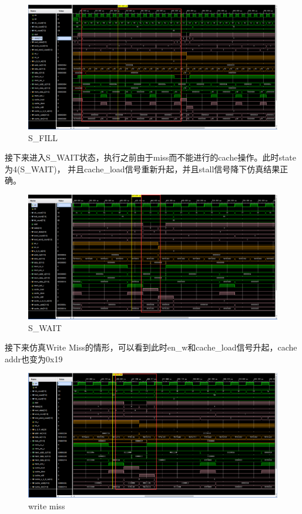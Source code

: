 \begin{figure}[H]
    \centering
    \includegraphics[width=1.0\textwidth]{figs/sres3.png}
    \caption{S\_FILL}
    \label{Fig.6}
\end{figure}

接下来进入S\_WAIT状态，执行之前由于miss而不能进行的cache操作。此时state为4(S\_WAIT)，
并且cache\_load信号重新升起，并且stall信号降下仿真结果正确。

\begin{figure}[H]
    \centering
    \includegraphics[width=1.0\textwidth]{figs/sres4.png}
    \caption{S\_WAIT}
    \label{Fig.7}
\end{figure}

接下来仿真Write Miss的情形，可以看到此时en\_w和cache\_load信号升起，cache addr也变为0x19

\begin{figure} [H]
    \centering
    \includegraphics[width=1.0\textwidth]{figs/sres5.png}
    \caption{write miss}
    \label{Fig.8}
\end{figure}

